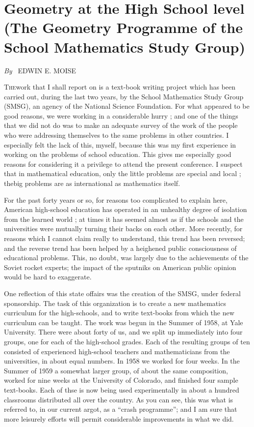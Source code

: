 
\chapter[Geometry at the High School level...]{Geometry at the High School level (The Geometry Programme of
  the School Mathematics Study Group)}

\begin{center}
{\em By~} EDWIN E. MOISE
\end{center}

\setcounter{pageoriginal}{80}
\textsc{The}\pageoriginale work that I shall report on is a text-book
writing project which has been carried out, during the last two years,
by the School Mathematics Study Group (SMSG), an agency of the
National Science Foundation. For what appeared to be good reasons,
we were working in a considerable hurry ; and one of the things that
we did not do was to make an adequate survey of the work of the
people who were addressing themselves to the same problems in other
countries. I especially felt the lack of this, myself, because this
was my first experience in working on the problems of school
education. This gives me especially good reasons for considering it a
privilege to attend the present conference. I suspect that in
mathematical education, only the little problems are special and local
; thebig problems are as international as mathematics itself.

For the past forty years or so, for reasons too complicated to explain
here, American high-school education has operated in an unhealthy
degree of isolation from the learned world ; at times it has seemed
almost as if the schools and the universities were mutually turning
their backs on each other. More recently, for reasons which I cannot
claim really to understand, this trend has been reversed; and the
reverse trend has been helped by a heighened public consciousness of
educational problems. This, no doubt, was largely due to the
achievements of the Soviet rocket experts; the impact of the sputniks
on American public opinion would be hard to exaggerate.

One reflection of this state offairs was the creation of the SMSG,
under federal sponsorship. The task of this organization is to create
a new mathematics curriculum for the high-schools, and to write
text-books from which the new curriculum can be taught. The work was
begun in the Summer of 1958, at Yale University. There\pageoriginale
were about forty of us, and we split up immediately into four groups,
one for each of the high-school grades. Each of the resulting groups
of ten consisted of experienced high-school teachers and
mathematicians from the universities, in about equal numbers. In 1958
we worked for four weeks. In the Summer of 1959 a somewhat larger
group, of about the same composition, worked for nine weeks at the
University of Colorado, and finished four sample text-books. Each of
thse is now being used experimentally in about a hundred classrooms
distributed all over the country. As you can see, this was what is
referred to, in our current argot, as a ``crash programme''; and I am
sure that more leisurely efforts will permit considerable improvements
in what we did.


